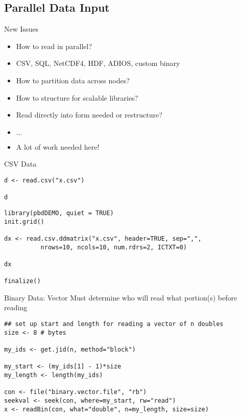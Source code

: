 \subsection{Parallel Data Input}
\makesubcontentsslidessec


\begin{frame}
  \begin{block}{New Issues}\pause
    \begin{itemize}
    \item How to read in parallel?
    \item CSV, SQL, NetCDF4, HDF, ADIOS, custom binary
    \item How to partition data across nodes?
    \item How to structure for scalable libraries?
    \item Read directly into form needed or restructure?
    \item $\ldots$
    \item A lot of work needed here!
    \end{itemize}
  \end{block}
\end{frame}



\begin{frame}[fragile]
  \begin{exampleblock}{CSV Data}\pause
\begin{lstlisting}[title=Serial Code]
d <- read.csv("x.csv")

d
\end{lstlisting}

\begin{lstlisting}[title=Parallel Code]
library(pbdDEMO, quiet = TRUE)
init.grid()

dx <- read.csv.ddmatrix("x.csv", header=TRUE, sep=",", 
          nrows=10, ncols=10, num.rdrs=2, ICTXT=0)

dx

finalize()
\end{lstlisting}
  \end{exampleblock}
\end{frame}

\begin{frame}[fragile]
  \begin{exampleblock}{Binary Data: Vector}\pause
  Must determine who will read what portion(s) before reading
    \begin{lstlisting}
## set up start and length for reading a vector of n doubles
size <- 8 # bytes

my_ids <- get.jid(n, method="block")

my_start <- (my_ids[1] - 1)*size
my_length <- length(my_ids)

con <- file("binary.vector.file", "rb")
seekval <- seek(con, where=my_start, rw="read")
x <- readBin(con, what="double", n=my_length, size=size)
    \end{lstlisting}
  \end{exampleblock}
\end{frame}

